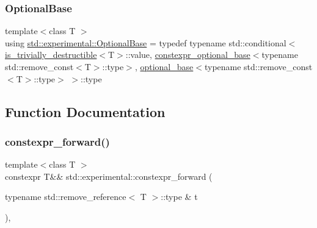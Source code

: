 \subsubsection{\texorpdfstring{Optional\+Base}{OptionalBase}}
{\footnotesize\ttfamily template$<$class T $>$ \\
using \mbox{\hyperlink{namespacestd_1_1experimental_a33aa5e258a2b0762197365c1ef3f90aa}{std\+::experimental\+::\+Optional\+Base}} = typedef typename std\+::conditional$<$ \mbox{\hyperlink{namespacestd_1_1experimental_a481cc29b2f00961d0afc189e6e90f739}{is\+\_\+trivially\+\_\+destructible}}$<$T$>$\+::value, \mbox{\hyperlink{structstd_1_1experimental_1_1constexpr__optional__base}{constexpr\+\_\+optional\+\_\+base}}$<$typename std\+::remove\+\_\+const$<$T$>$\+::type$>$, \mbox{\hyperlink{structstd_1_1experimental_1_1optional__base}{optional\+\_\+base}}$<$typename std\+::remove\+\_\+const$<$T$>$\+::type$>$ $>$\+::type}



\subsection{Function Documentation}
\mbox{\label{namespacestd_1_1experimental_ad6c79ef527ee25f0a6295128c4b51f89}} 
\subsubsection{\texorpdfstring{constexpr\+\_\+forward()}{constexpr\_forward()}\hspace{0.1cm}{\footnotesize\ttfamily [1/2]}}
{\footnotesize\ttfamily template$<$class T $>$ \\
constexpr T\&\& std\+::experimental\+::constexpr\+\_\+forward (\begin{DoxyParamCaption}\item[{typename std\+::remove\+\_\+reference$<$ T $>$\+::type \&}]{t }\end{DoxyParamCaption})\hspace{0.3cm}{\ttfamily [inline]}, {\ttfamily [noexcept]}}

\mbox{\label{namespacestd_1_1experimental_a9bcca6a02f6e3005b3180962429c6feb}} 
